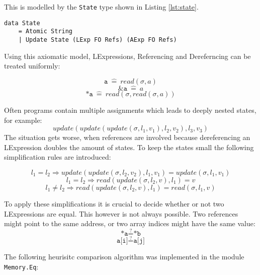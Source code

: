 \documentclass[12pt]{article}
\begin{document}
This is modelled by the \texttt{State} type shown in Listing \ref{lst:state}.

\begin{lstlisting}[style=c0, caption=State, label=lst:state]
data State
    = Atomic String
    | Update State (LExp FO Refs) (AExp FO Refs)
\end{lstlisting}

Using this axiomatic model, LExpressions, Referencing and Dereferncing can be treated uniformly:

\[ \texttt{a}\ \hat{=}\ read(\sigma, a) \]
\[ \texttt{\&a}\ \hat{=}\ a \]
\[ \texttt{*a}\ \hat{=}\ read(\sigma, read(\sigma, a))\]

Often programs contain multiple assignments which leads to deeply nested states, for example:
\[ update(update(update(\sigma, l_1, v_1), l_2, v_2), l_3, v_3) \]
The situation gets worse, when references are involved because dereferencing an LExpression doubles the amount of states. 
To keep the states small the following simplification rules are introduced:

\[ l_1 = l_2 \Rightarrow update(update(\sigma, l_2 , v_2), l_1, v_1) = update(\sigma, l_1 , v_1)\]
\[ l_1 = l_2 \Rightarrow read(update(\sigma, l_2 , v), l_1) = v \]
\[ l_1 \neq l_2 \Rightarrow read(update(\sigma, l_2 , v), l_1) = read(\sigma, l_1 , v) \]

To apply these simplifications it is crucial to decide whether or not two LExpressions are equal.
This however is not always possible.
Two references might point to the same address, or two array indices might have the same value:
\[ \texttt{*a} \stackrel{?}{=} \texttt{*b} \]
\[ \texttt{a[i]} \stackrel{?}{=} \texttt{a[j]} \]

The following heurisitc comparison algorithm was implemented in the module \texttt{Memory.Eq}:
\end{document}
